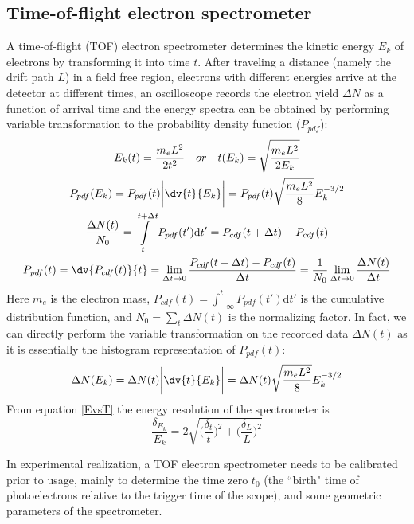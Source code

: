 \subsection{Time-of-flight electron spectrometer}

A time-of-flight (TOF) electron spectrometer determines the kinetic energy $E_{k}$ of electrons by transforming it into time $t$. After traveling a distance (namely the drift path $L$) in a field free region, electrons with different energies arrive at the detector at different times, an oscilloscope records the electron yield $\Delta N$ as a function of arrival time and the energy spectra can be obtained by performing variable transformation to the probability density function ($P_{pdf}$):
\begin{subequations}
\begin{gather}
    E_k(t) = \frac{m_eL^2}{2t^2}\quad or\quad t(E_k) = \sqrt{\frac{m_{e}L^2}{2E_{k}}} \label{EvsT} \\
    P_{pdf}(E_{k}) = P_{pdf}(t)\bigg| \dv{t}{E_{k}} \bigg| = P_{pdf}(t) \sqrt{\frac{m_{e}L^2}{8}}E_{k}^{-3/2}\\
    \frac{\Delta N(t)}{N_0}
               = \int\limits_{t}^{t + \Delta t} P_{pdf}(t')\mathrm{d}t'
               = P_{cdf}(t + \Delta t) - P_{cdf}(t)\\
    P_{pdf}(t) = \dv{P_{cdf}(t)}{t} = \lim_{\Delta t \to 0} \frac{P_{cdf}(t + \Delta t) - P_{cdf}(t)}{\Delta t} = \frac{1}{N_0} \lim_{\Delta t \to 0} \frac{\Delta N(t)}{\Delta t}
\end{gather}
\end{subequations}
Here $m_e$ is the electron mass, $P_{cdf}(t) = \int_{-\infty}^{t} P_{pdf}(t')\mathrm{d}t'$ is the cumulative distribution function, and $N_0 = \sum\limits_{t} \Delta N(t)$ is the normalizing factor. In fact, we can directly perform the variable transformation on the recorded data $\Delta N(t)$ as it is essentially the histogram representation of $P_{pdf}(t)$:
\begin{equation}
    \Delta N(E_k) = \Delta N(t) \bigg| \dv{t}{E_{k}} \bigg| = \Delta N(t) \sqrt{\frac{m_{e}L^2}{8}}E_{k}^{-3/2}
\end{equation}
From equation \ref{EvsT} the energy resolution of the spectrometer is
\begin{equation}
    \frac{\delta_{E_k}}{E_k} = 2\sqrt{\big(\frac{\delta_{t}}{t}\big)^2 + \big(\frac{\delta_{L}}{L}\big)^2}
\end{equation}

In experimental realization, a TOF electron spectrometer needs to be calibrated prior to usage, mainly to determine the time zero $t_{0}$ (the ``birth" time of photoelectrons relative to the trigger time of the scope), and some geometric parameters of the spectrometer. 


